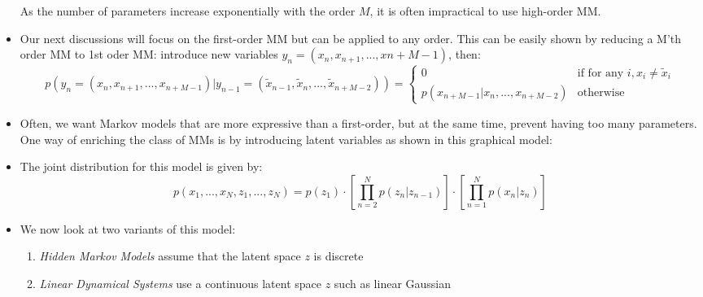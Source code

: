 \begin{itemize}
	As the number of parameters increase exponentially with the order $M$, it is often impractical to use high-order MM. 
	\item Our next discussions will focus on the first-order MM but can be applied to any order. This can be easily shown by reducing a M'th order MM to 1st oder MM: introduce new variables $y_n=(x_n,x_{n+1},...,x{n+M-1})$, then:
	$$p(y_n=(x_n,x_{n+1},...,x_{n+M-1})|y_{n-1}=(\tilde{x}_{n-1},\tilde{x}_n,...,\tilde{x}_{n+M-2}))=\begin{cases}
	0 & \text{if for any } i, x_i\neq \tilde{x}_i\\
	p(x_{n+M-1}|x_n,...,x_{n+M-2}) & \text{otherwise}
	\end{cases}$$
	\item Often, we want Markov models that are more expressive than a first-order, but at the same time, prevent having too many parameters. One way of enriching the class of MMs is by introducing latent variables as shown in this graphical model:
	
	\begin{figure}[ht!]
		\centering
	\end{figure}
	\item The joint distribution for this model is given by: $$p(x_1,...,x_N,z_1,...,z_N)=p(z_1)\cdot \left[\prod_{n=2}^{N} p(z_n|z_{n-1})\right]\cdot \left[\prod_{n=1}^{N} p(x_n|z_{n})\right]$$
	\item We now look at two variants of this model:
	\begin{enumerate}
		\item \textit{Hidden Markov Models} assume that the latent space $z$ is discrete
		\item \textit{Linear Dynamical Systems} use a continuous latent space $z$ such as linear Gaussian
	\end{enumerate}
\end{itemize}

